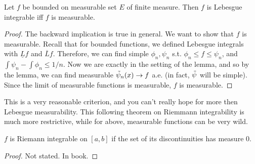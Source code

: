   \begin{theorem}
    Let $f$ be bounded on measurable set $E$ of finite measure. Then $f$ is Lebesgue integrable iff $f$ is measurable. 
  \end{theorem}
  \begin{proof}
    The backward implication is true in general. We want to show that $f$ is measurable. Recall that for bounded functions, we defined Lebesgue integrals with $\underline{L}f$ and $\overline{L}f$. Therefore, we can find simple $\phi_n, \psi_n$ s.t. $\phi_n \leq f \leq \psi_n$, and $\int \psi_n - \int \phi_n \leq 1/n$. Now we are exactly in the setting of the lemma, and so by the lemma, we can find measurable $\Tilde{\psi}_n (x) \to f$ a.e. (in fact, $\Tilde{\psi}$ will be simple). Since the limit of measurable functions is measurable, $f$ is measurable.
  \end{proof}

  This is a very reasonable criterion, and you can't really hope for more then Lebesgue measurability. This following theorem on Riemmann integrability is much more restrictive, while for above, measurable functions can be very wild. 

  \begin{theorem}
    $f$ is Riemann integrable on $[a, b]$ if the set of its discontinuities has measure $0$. 
  \end{theorem}
  \begin{proof}
    Not stated. In book. 
  \end{proof}



